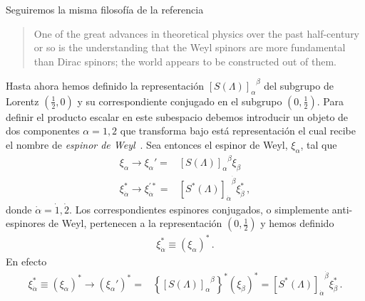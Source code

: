 Seguiremos la misma filosofía de la referencia~\cite{Zee:2016fuk}
\begin{quote}
  One of the great advances in theoretical physics over the past half-century or so is the
understanding that the Weyl spinors are more fundamental than Dirac spinors; the world
appears to be constructed out of them.
\end{quote}

\begin{frame}
  Hasta ahora hemos definido la representación ${[S(\Lambda)]_{\alpha}}^{\beta}$ del subgrupo de Lorentz $(\frac{1}{2},0)$ y su correspondiente conjugado en el subgrupo $(0,\frac{1}{2})$. Para definir el producto escalar en este subespacio debemos introducir un objeto de dos componentes $\alpha=1,2$ que transforma bajo está representación el cual recibe el nombre de \emph{espinor de Weyl}~\cite{Dreiner:2008tw,Quevedo:2010ui}. Sea entonces el espinor de Weyl, $\xi_{\alpha}$, tal que
\begin{align*}
    \xi_{\alpha} \to \xi_{\alpha}'=&{\left[ S(\Lambda) \right]_{\alpha}}^{\beta}\xi_{\beta} \nonumber\\
  \xi_{\dot{\alpha}}^{*}\to \xi_{\dot{\alpha}}^{\prime *}
  =&{\left[ S^{*}(\Lambda) \right]_{\dot{\alpha}}}^{\dot{\beta}}\xi_{\dot{\beta}}^{*}\,,
\end{align*}
donde $\dot{\alpha}=\dot{1},\dot{2}$.  Los correspondientes espinores conjugados, o simplemente anti-espinores de Weyl, pertenecen a la representación $\left( 0,\frac{1}{2}\right)$ y hemos
definido
\begin{align}
\xi_{\dot{\alpha}}^{*}\equiv  \left( \xi_{\alpha} \right)^{*}\,.
\end{align}
En efecto
\begin{align}
 \xi_{\dot{\alpha}}^{*}\equiv \left( \xi_{\alpha} \right)^{*} \to \left( \xi_{\alpha}' \right)^{*}=&
 \left\{ {\left[ S(\Lambda) \right]_{\alpha}}^{\beta} \right\}^{*} \left( \xi_{\beta} \right)^{*} = {\left[ S^{*}(\Lambda) \right]_{\dot{\alpha}}}^{\dot{\beta}}\xi_{\dot{\beta}}^{*}\,.
\end{align}
  

\end{frame}
